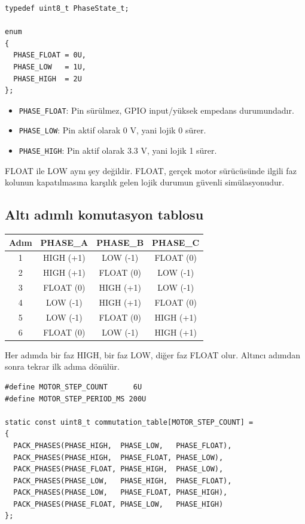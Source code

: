\documentclass[11pt,a4paper]{article}
\begin{document}
\begin{lstlisting}
typedef uint8_t PhaseState_t;

enum
{
  PHASE_FLOAT = 0U,
  PHASE_LOW   = 1U,
  PHASE_HIGH  = 2U
};
\end{lstlisting}

\begin{itemize}
  \item \texttt{PHASE\_FLOAT}: Pin sürülmez, GPIO input/yüksek empedans durumundadır.
  \item \texttt{PHASE\_LOW}: Pin aktif olarak 0 V, yani lojik 0 sürer.
  \item \texttt{PHASE\_HIGH}: Pin aktif olarak 3.3 V, yani lojik 1 sürer.
\end{itemize}

FLOAT ile LOW aynı şey değildir. FLOAT, gerçek motor sürücüsünde ilgili faz
kolunun kapatılmasına karşılık gelen lojik durumun güvenli simülasyonudur.

\subsection{Altı adımlı komutasyon tablosu}

\begin{center}
\begin{tabular}{cccc}
\toprule
Adım & PHASE\_A & PHASE\_B & PHASE\_C \\
\midrule
1 & HIGH (+1) & LOW (-1) & FLOAT (0) \\
2 & HIGH (+1) & FLOAT (0) & LOW (-1) \\
3 & FLOAT (0) & HIGH (+1) & LOW (-1) \\
4 & LOW (-1) & HIGH (+1) & FLOAT (0) \\
5 & LOW (-1) & FLOAT (0) & HIGH (+1) \\
6 & FLOAT (0) & LOW (-1) & HIGH (+1) \\
\bottomrule
\end{tabular}
\end{center}

Her adımda bir faz HIGH, bir faz LOW, diğer faz FLOAT olur. Altıncı adımdan
sonra tekrar ilk adıma dönülür.

\begin{lstlisting}
#define MOTOR_STEP_COUNT      6U
#define MOTOR_STEP_PERIOD_MS 200U

static const uint8_t commutation_table[MOTOR_STEP_COUNT] =
{
  PACK_PHASES(PHASE_HIGH,  PHASE_LOW,   PHASE_FLOAT),
  PACK_PHASES(PHASE_HIGH,  PHASE_FLOAT, PHASE_LOW),
  PACK_PHASES(PHASE_FLOAT, PHASE_HIGH,  PHASE_LOW),
  PACK_PHASES(PHASE_LOW,   PHASE_HIGH,  PHASE_FLOAT),
  PACK_PHASES(PHASE_LOW,   PHASE_FLOAT, PHASE_HIGH),
  PACK_PHASES(PHASE_FLOAT, PHASE_LOW,   PHASE_HIGH)
};
\end{lstlisting}
\end{document}
